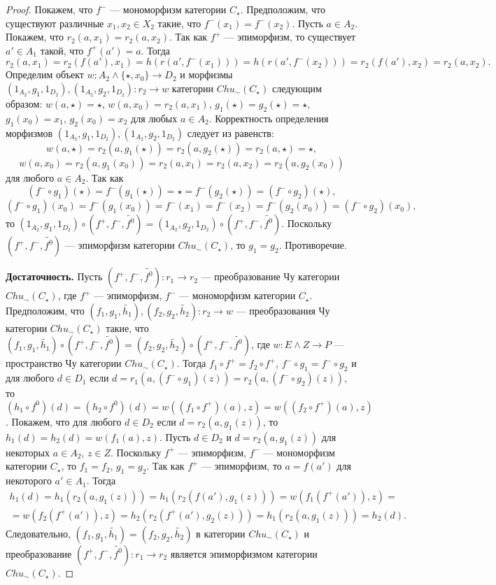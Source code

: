 \documentclass[a4paper,12pt]{article}
\newcommand{\fo}{\widetilde{f^0}}
\begin{document}
\begin{proof}
    Покажем, что $f^-$ --- мономорфизм категории $C_\star$. Предположим, что существуют различные $x_1, x_2 \in X_2$ такие, что $f^-(x_1) = f^-(x_2)$. Пусть $a \in A_2$. Покажем, что $r_2(a,x_1) = r_2(a,x_2)$. Так как $f^+$ --- эпиморфизм, то существует $a' \in A_1$ такой, что $f^+(a') = a$. Тогда
    $$
        r_2(a,x_1) = r_2(f(a'),x_1) = h(r(a',f^-(x_1))) = h(r(a',f^-(x_2))) = r_2(f(a'),x_2) = r_2(a,x_2).
    $$
    Определим объект $w: A_2 \wedge \{\star,x_0\} \to D_2$ и морфизмы $(1_{A_2},g_1,1_{D_2}), (1_{A_2},g_2,1_{D_2}): r_2 \to w$ категории $Chu_\sim(C_\star)$ следующим образом: $w(a,\star) = \star$, $w(a,x_0) = r_2(a,x_1)$, $g_1(\star) = g_2(\star) = \star$, $g_1(x_0) = x_1$, $g_2(x_0) = x_2$ для любых $a \in A_2$. Корректность определения морфизмов $(1_{A_2},g_1,1_{D_2}), (1_{A_2},g_2,1_{D_2})$ следует из равенств:
    $$
        w(a,\star) = r_2(a,g_1(\star)) = r_2(a,g_2(\star)) = r_2(a,\star) = \star,
    $$
    $$
        w(a,x_0) = r_2(a,g_1(x_0)) = r_2(a,x_1) = r_2(a,x_2) = r_2(a,g_2(x_0))
    $$
    для любого $a \in A_2$. Так как
    $$
        (f^- \circ g_1)(\star) = f^-(g_1(\star)) = \star = f^-(g_2(\star)) = (f^- \circ g_2)(\star),
    $$
    $$
        (f^- \circ g_1)(x_0) = f^-(g_1(x_0)) = f^-(x_1) = f^-(x_2) = f^-(g_2(x_0)) = (f^- \circ g_2)(x_0),
    $$
    то $(1_{A_2},g_1,1_{D_2}) \circ (f^+,f^-,\fo) = (1_{A_2},g_2,1_{D_2}) \circ (f^+,f^-,\fo)$. Поскольку $(f^+,f^-,\fo)$ --- эпиморфизм категории $Chu_\sim(C_\star)$, то $g_1 = g_2$. Противоречие.

    \textbf{Достаточность.} Пусть $(f^+,f^-,\fo): r_1 \to r_2$ --- преобразование Чу категории $Chu_\sim(C_\star)$, где $f^+$ --- эпиморфизм, $f^-$ --- мономорфизм категории $C_{\star}$. Предположим, что $(f_1,g_1,\widetilde{h_1}), (f_2,g_2,\widetilde{h_2}): r_2 \to w$ --- преобразования Чу категории $Chu_\sim(C_\star)$ такие, что $(f_1,g_1,\widetilde{h_1}) \circ (f^+,f^-,\fo) = (f_2,g_2,\widetilde{h_2}) \circ (f^+,f^-,\fo)$, где $w: E \wedge Z \to P$ --- пространство Чу категории $Chu_\sim(C_\star)$. Тогда $f_1 \circ f^+ = f_2 \circ f^+$, $f^- \circ g_1 = f^- \circ g_2$ и для любого $d \in D_1$ если $d = r_1(a,(f^- \circ g_1)(z)) = r_2(a,(f^- \circ g_2)(z))$, то $(h_1 \circ f^0)(d) = (h_2 \circ f^0)(d) = w((f_1 \circ f^+)(a), z) = w((f_2 \circ f^+)(a), z)$. Покажем, что для любого $d \in D_2$ если $d = r_2(a,g_1(z))$, то $h_1(d) = h_2(d) = w(f_1(a),z)$. Пусть $d \in D_2$ и $d = r_2(a,g_1(z))$ для некоторых $a \in A_2$, $z \in Z$. Поскольку $f^+$ --- эпиморфизм, $f^-$ --- мономорфизм категории $C_\star$, то $f_1 = f_2$, $g_1 = g_2$. Так как $f^+$ --- эпиморфизм, то $a = f(a')$ для некоторого $a' \in A_1$. Тогда 
    \begin{multline*}
        h_1(d) = h_1(r_2(a,g_1(z))) = h_1(r_2(f(a'),g_1(z))) = w(f_1(f^+(a')),z) =\\=
        w(f_2(f^+(a')),z) = h_2(r_2(f^+(a'),g_2(z))) = h_1(r_2(a,g_1(z))) = h_2(d).
    \end{multline*}
    Следовательно, $(f_1,g_1,\widetilde{h_1}) = (f_2,g_2,\widetilde{h_2})$ в категории $Chu_\sim(C_\star)$ и преобразование $(f^+,f^-,\fo): r_1 \to r_2$ является эпиморфизмом категории $Chu_\sim(C_\star)$.
\end{proof}
\end{document}
